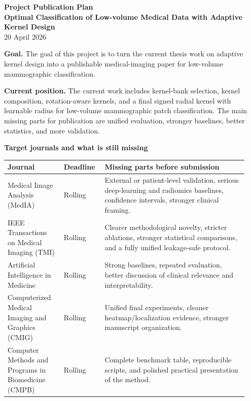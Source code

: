 \documentclass[10pt]{article}
\begin{document}
\small

\begin{center}
{\Large \textbf{Project Publication Plan}}\\
\textbf{Optimal Classification of Low-volume Medical Data with Adaptive Kernel Design}\\
20 April 2026
\end{center}

\textbf{Goal.} The goal of this project is to turn the current thesis work on adaptive kernel design into a publishable medical-imaging paper for low-volume mammographic classification.

\textbf{Current position.} The current work includes kernel-bank selection, kernel composition, rotation-aware kernels, and a final signed radial kernel with learnable radius for low-volume mammographic patch classification. The main missing parts for publication are unified evaluation, stronger baselines, better statistics, and more validation.

\textbf{Target journals and what is still missing}

\begin{tabular}{>{\raggedright\arraybackslash}p{0.22\linewidth}>{\raggedright\arraybackslash}p{0.16\linewidth}>{\raggedright\arraybackslash}p{0.56\linewidth}}
\toprule
\textbf{Journal} & \textbf{Deadline} & \textbf{Missing parts before submission} \\
\midrule
Medical Image Analysis (MedIA) & Rolling & External or patient-level validation, serious deep-learning and radiomics baselines, confidence intervals, stronger clinical framing. \\
IEEE Transactions on Medical Imaging (TMI) & Rolling & Clearer methodological novelty, stricter ablations, stronger statistical comparisons, and a fully unified leakage-safe protocol. \\
Artificial Intelligence in Medicine & Rolling & Strong baselines, repeated evaluation, better discussion of clinical relevance and interpretability. \\
Computerized Medical Imaging and Graphics (CMIG) & Rolling & Unified final experiments, cleaner heatmap/localization evidence, stronger manuscript organization. \\
Computer Methods and Programs in Biomedicine (CMPB) & Rolling & Complete benchmark table, reproducible scripts, and polished practical presentation of the method. \\
\bottomrule
\end{tabular}
\end{document}
